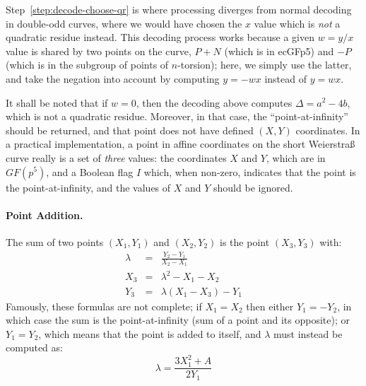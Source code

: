\documentclass{llncs}
\newcommand{\GF}{GF}
\begin{document}
Step~\ref{step:decode-choose-qr} is where processing diverges from
normal decoding in double-odd curves, where we would have chosen the $x$
value which is \emph{not} a quadratic residue instead. This decoding
process works because a given $w = y/x$ value is shared by two points on
the curve, $P+N$ (which is in ecGFp5) and $-P$ (which is in the subgroup
of points of $n$-torsion); here, we simply use the latter, and take the
negation into account by computing $y = -wx$ instead of $y = wx$.

It shall be noted that if $w = 0$, then the decoding above computes
$\Delta = a^2 - 4b$, which is not a quadratic residue. Moreover, in that
case, the ``point-at-infinity'' should be returned, and that point does
not have defined $(X,Y)$ coordinates. In a practical implementation, a
point in affine coordinates on the short Weierstraß curve really is a
set of \emph{three} values: the coordinates $X$ and $Y$, which are in
$\GF(p^5)$, and a Boolean flag $I$ which, when non-zero, indicates that
the point is the point-at-infinity, and the values of $X$ and $Y$ should
be ignored.

\paragraph{Point Addition.} The sum of two points $(X_1, Y_1)$
and $(X_2, Y_2)$ is the point $(X_3, Y_3)$ with:
\begin{eqnarray*}
    \lambda &=& \frac{Y_2 - Y_1}{X_2 - X_1} \\
    X_3 &=& \lambda^2 - X_1 - X_2 \\
    Y_3 &=& \lambda (X_1 - X_3) - Y_1
\end{eqnarray*}
Famously, these formulas are not complete; if $X_1 = X_2$ then either
$Y_1 = -Y_2$, in which case the sum is the point-at-infinity (sum of
a point and its opposite); or $Y_1 = Y_2$, which means that the point
is added to itself, and $\lambda$ must instead be computed as:
\begin{equation*}
    \lambda = \frac{3 X_1^2 + A}{2 Y_1}
\end{equation*}
\end{document}
